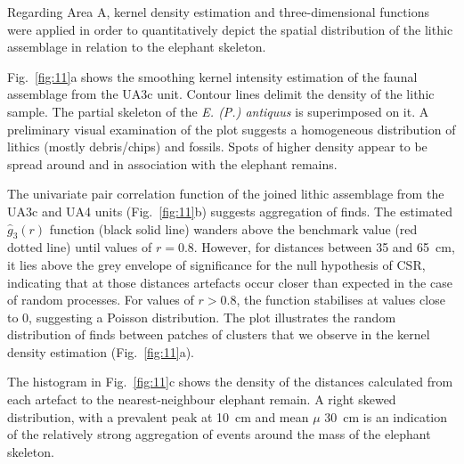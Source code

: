 \documentclass[preprint,authoryear,times]{elsarticle} %
\begin{document}
Regarding Area A, kernel density estimation and three-dimensional functions were applied in order to quantitatively depict the spatial distribution of the lithic assemblage in relation to the elephant skeleton.

Fig.~\ref{fig:11}a shows the smoothing kernel intensity estimation of the %
faunal assemblage from the UA3c unit. Contour lines delimit the density of the lithic sample. The partial skeleton of the \emph{E. (P.) antiquus} is superimposed on it. A preliminary visual examination of the plot suggests a homogeneous distribution of lithics (mostly debris/chips) and fossils. Spots of higher density appear to be spread around and in association with the elephant remains.

The univariate pair correlation function of the joined lithic assemblage from the UA3c and UA4 units (Fig.~\ref{fig:11}b) suggests aggregation of finds. The estimated $\hat{g}_3(r)$ function (black solid line) wanders above the benchmark value (red dotted line) until values of $r=0.8$. However, for distances between 35 and 65~cm, it lies above the grey envelope of significance for the null hypothesis of CSR, indicating that at those distances artefacts occur closer than expected in the case of random processes. For values of $r>0.8$, the function stabilises at values close to 0, suggesting a Poisson distribution. The plot illustrates the random distribution of finds between patches of clusters that we observe in the kernel density estimation (Fig.~\ref{fig:11}a).

The histogram in Fig.~\ref{fig:11}c shows the density of the distances calculated from each artefact to the nearest-neighbour elephant remain. A right skewed distribution, with a prevalent peak at 10~cm and mean $\mu$ 30~cm is an indication of the relatively strong aggregation of events around the mass of the elephant skeleton.
\end{document}
